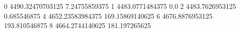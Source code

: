 0 4490.32470703125 7.24755859375
1 4483.0771484375 0.0
2 4483.7626953125 0.685546875
4 4652.23583984375 169.15869140625
6 4676.8876953125 193.810546875
8 4664.2744140625 181.197265625
